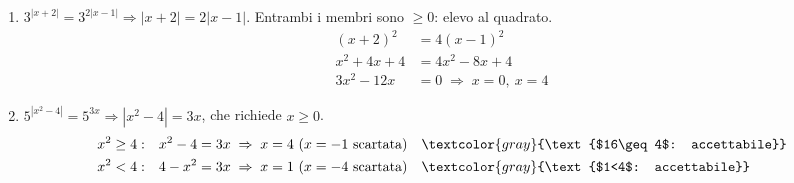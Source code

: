 \begin{question}[ID=4.5, subtitle={Valore assoluto e incognita anche fuori dal modulo}, difficulty=difficile, tags={equazioni, esponenziali, valore assoluto}]
\begin{explanation}
\begin{enumerate}
\[\begin{aligned}
    x<1: &\quad 1-x=2x \;\Rightarrow\; x=\dfrac13 && \textcolor{gray}{\text{accettabile}}
    \end{aligned}\]
    \item $3^{|x+2|}=3^{2|x-1|} \Rightarrow |x+2|=2|x-1|$. Entrambi i membri sono $\geq0$: elevo al quadrato.
    \[\begin{aligned}
    (x+2)^2 &= 4(x-1)^2\\
    x^2+4x+4 &= 4x^2-8x+4\\
    3x^2-12x &= 0 \;\Rightarrow\; x=0,\ x=4
    \end{aligned}\]
    \item $5^{|x^2-4|}=5^{3x} \Rightarrow |x^2-4|=3x$, che richiede $x\geq0$.
    \[\begin{aligned}
    x^2\geq4: &\quad x^2-4=3x \;\Rightarrow\; x=4\ (x=-1 \text{ scartata}) && \textcolor{gray}{\text{$16\geq4$: accettabile}}\\
    x^2<4: &\quad 4-x^2=3x \;\Rightarrow\; x=1\ (x=-4 \text{ scartata}) && \textcolor{gray}{\text{$1<4$: accettabile}}
    \end{aligned}\]
\end{enumerate}
\end{explanation}
\end{question}

